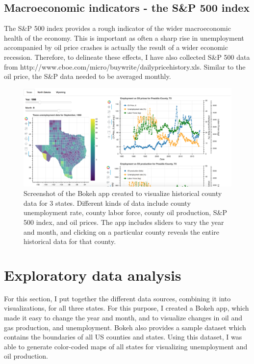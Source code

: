 \documentclass[11pt,letterpaper]{article}
\begin{document}
\subsection{Macroeconomic indicators - the S\&P 500 index}

The S\&P 500 index provides a rough indicator of the wider macroeconomic health of the economy. This is important as often a sharp rise in unemployment accompanied by oil price crashes is actually the result of a wider economic recession. Therefore, to delineate these effects, I have also collected S\&P 500 data from http://www.cboe.com/micro/buywrite/dailypricehistory.xls. Similar to the oil price, the S\&P data needed to be averaged monthly.

\begin{figure}
\includegraphics[width=\textwidth]{BokehAppScreenshot}
\caption{Screenshot of the Bokeh app created to visualize historical county data for 3 states. Different kinds of data include county unemployment rate,  county labor force, county oil production, S\&P 500 index, and oil prices. The app includes sliders to vary the year and month, and clicking on a particular county reveals the entire historical data for that county.}
\label{fig:bokeh_app}
\end{figure}

\section{Exploratory data analysis}
For this section, I put together the different data sources, combining it into visualizations, for all three states. For this purpose, I created a Bokeh app, which made it easy to change the year and month, and to visualize changes in oil and gas production, and unemployment. Bokeh also provides a sample dataset which contains the boundaries of all US counties and states. Using this dataset, I was able to generate color-coded maps of all states for visualizing unemployment and oil production.
\end{document}
